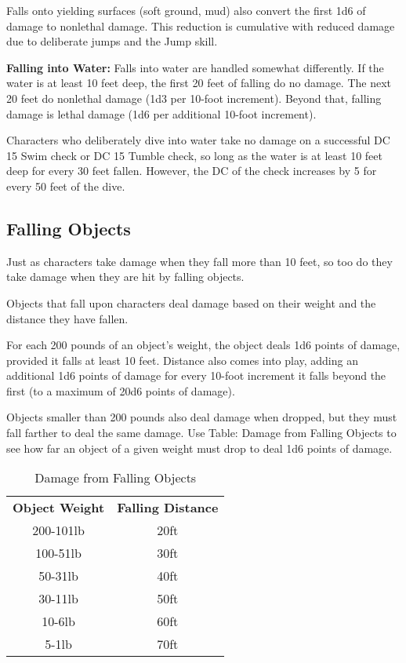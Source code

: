 Falls onto yielding surfaces (soft ground, mud) also convert the first 1d6 of damage 
to nonlethal damage. This reduction is cumulative with reduced damage due to deliberate 
jumps and the Jump skill.

\textbf{Falling into Water:} Falls into water are handled somewhat differently. 
If the water is at least 10 feet deep, the first 20 feet of falling do no damage. 
The next 20 feet do nonlethal damage (1d3 per 10-foot increment). Beyond that, 
falling damage is lethal damage (1d6 per additional 10-foot increment).

Characters who deliberately dive into water take no damage on a successful DC 15 
Swim check or DC 15 Tumble check, so long as the water is at least 10 feet deep 
for every 30 feet fallen. However, the DC of the check increases by 5 for every 
50 feet of the dive. 

\subsection{Falling Objects}

Just as characters take damage when they fall more than 10 feet, so too do they 
take damage when they are hit by falling objects.

Objects that fall upon characters deal damage based on their weight and the distance 
they have fallen.

For each 200 pounds of an object's weight, the object deals 1d6 points of damage, 
provided it falls at least 10 feet. Distance also comes into play, adding an additional 
1d6 points of damage for every 10-foot increment it falls beyond the first (to 
a maximum of 20d6 points of damage).

Objects smaller than 200 pounds also deal damage when dropped, but they must fall 
farther to deal the same damage. Use Table: Damage from Falling Objects to see 
how far an object of a given weight must drop to deal 1d6 points of damage.

\begin{table}[htb]
\caption{Damage from Falling Objects}
\centering
\begin{tabular}{cc}
\textbf{Object Weight} & \textbf{Falling Distance}\\
200-101lb & 20ft\\
100-51lb & 30ft\\
50-31lb & 40ft\\
30-11lb & 50ft\\
10-6lb & 60ft\\
5-1lb & 70ft\\
\end{tabular}
\end{table}

